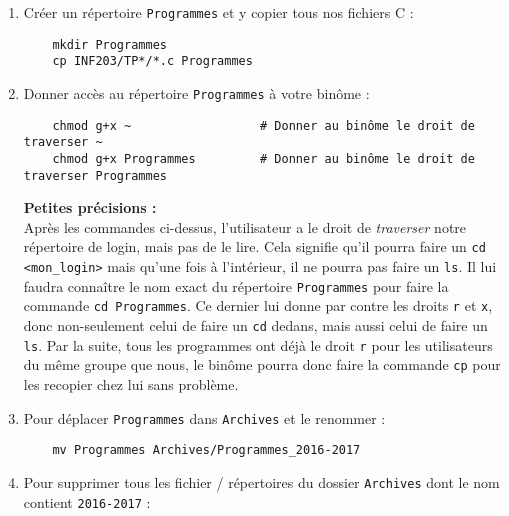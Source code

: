 \documentclass[10pt]{article}
\begin{document}
\begin{enumerate}
  \setlength\itemsep{1em}

\item Créer un répertoire \texttt{Programmes} et y copier tous nos fichiers C :

  \lstset{style=none}
  \begin{lstlisting}
    mkdir Programmes
    cp INF203/TP*/*.c Programmes
  \end{lstlisting}


\item Donner accès au répertoire \texttt{Programmes} à votre binôme :

  \lstset{style=none}
  \begin{lstlisting}
    chmod g+x ~                  # Donner au binôme le droit de traverser ~
    chmod g+x Programmes         # Donner au binôme le droit de traverser Programmes
  \end{lstlisting}

  \vspace{0.5cm}

  \textbf{Petites précisions :} \\
  Après les commandes ci-dessus, l'utilisateur a le droit de
  \textit{traverser} notre répertoire de login, mais pas de le lire. Cela
  signifie qu'il pourra faire un \texttt{cd <mon\_login>} mais qu'une
  fois à l'intérieur, il ne pourra pas faire un \texttt{ls}. Il lui
  faudra connaître le nom exact du répertoire \texttt{Programmes} pour
  faire la commande \texttt{cd~Programmes}. Ce dernier lui donne par
  contre les droits \texttt{r} et \texttt{x}, donc non-seulement celui
  de faire un \texttt{cd} dedans, mais aussi celui de faire un
  \texttt{ls}. Par la suite, tous les programmes ont déjà le droit
  \texttt{r} pour les utilisateurs du même groupe que nous, le binôme
  pourra donc faire la commande \texttt{cp} pour les recopier chez lui
  sans problème.

\item Pour déplacer \texttt{Programmes} dans \texttt{Archives} et le
  renommer :

  \lstset{style=none}
  \begin{lstlisting}
    mv Programmes Archives/Programmes_2016-2017
  \end{lstlisting}

\item Pour supprimer tous les fichier / répertoires du dossier
  \texttt{Archives} dont le nom contient \texttt{2016-2017} :


\end{enumerate}
\end{document}
